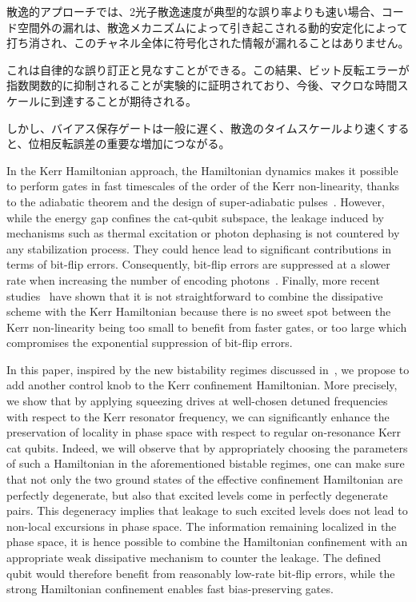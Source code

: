 散逸的アプローチでは、2光子散逸速度が典型的な誤り率よりも速い場合、コード空間外の漏れは、散逸メカニズムによって引き起こされる動的安定化によって打ち消され、このチャネル全体に符号化された情報が漏れることはありません。

これは自律的な誤り訂正と見なすことができる。この結果、ビット反転エラーが指数関数的に抑制されることが実験的に証明されており、今後、マクロな時間スケールに到達することが期待される。

しかし、バイアス保存ゲートは一般に遅く、散逸のタイムスケールより速くすると、位相反転誤差の重要な増加につながる。

In the Kerr Hamiltonian approach, the Hamiltonian dynamics makes it possible to perform gates in fast timescales of the order of the Kerr non-linearity, thanks to the adiabatic theorem and the design of super-adiabatic pulses~\cite{Xu2021}. However, while the energy gap confines the cat-qubit subspace, the leakage induced by mechanisms such as thermal excitation or photon dephasing is not countered by any stabilization process. They could hence lead to significant contributions in terms of bit-flip errors. Consequently, bit-flip errors are suppressed at a slower rate when increasing the number of encoding photons~\cite{Putterman2022,Gautier2022,Frattini-2022}. Finally, more recent studies~\cite{Gautier2022} have shown that it is not straightforward to combine the dissipative scheme with the Kerr Hamiltonian because there is no sweet spot between the Kerr non-linearity being too small to benefit from faster gates, or too large which compromises the exponential suppression of bit-flip errors. 

In this paper, inspired by the new bistability regimes discussed in~\cite{Roberts2019}, we propose to add another control knob to the Kerr confinement Hamiltonian. More precisely, we show that by applying squeezing drives at well-chosen detuned frequencies with respect to the Kerr resonator frequency, we can significantly enhance the preservation of locality in phase space with respect to regular on-resonance Kerr cat qubits. Indeed, we will observe that by appropriately choosing the parameters of such a Hamiltonian in the aforementioned bistable regimes, one can make sure that not only the two ground states of the effective confinement Hamiltonian are perfectly degenerate, but also that excited levels  come in perfectly degenerate pairs. This degeneracy implies that leakage to such excited levels does not lead to non-local excursions in phase space. The information remaining localized in the phase space, it is hence possible to combine the Hamiltonian confinement with an appropriate weak dissipative mechanism to counter the leakage. The defined qubit would therefore benefit from reasonably low-rate bit-flip errors, while the strong Hamiltonian confinement enables fast bias-preserving gates.  




